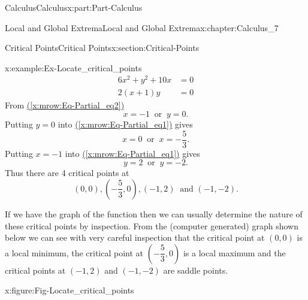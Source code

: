 \documentclass[oneside,10pt,]{book}
\newcommand{\xreffont}{\relax}
\numberwithin{equation}{section}
\newcommand{\amp}{&}
\begin{document}
\begin{partptx}{Calculus}{}{Calculus}{}{}{x:part:Part-Calculus}
\begin{chapterptx}{Local and Global Extrema}{}{Local and Global Extrema}{}{}{x:chapter:Calculus_7}
\begin{sectionptx}{Critical Points}{}{Critical Points}{}{}{x:section:Critical-Points}
\begin{example}{}{x:example:Ex-Locate_critical_points}
\begin{align}
6x^2 + y^2 + 10x \amp = 0\label{x:mrow:Eq-Partial_eq1}\\
2(x+1)y \amp = 0\label{x:mrow:Eq-Partial_eq2}
\end{align}
From \hyperref[x:mrow:Eq-Partial_eq2]{({\xreffont\ref{x:mrow:Eq-Partial_eq2}})}%
\begin{equation*}
x=-1 \: \text{ or } \: y=0\text{.}
\end{equation*}
Putting \(y=0\) into \hyperref[x:mrow:Eq-Partial_eq1]{({\xreffont\ref{x:mrow:Eq-Partial_eq1}})} gives%
\begin{equation*}
x=0 \: \text{ or } \: x=-\dfrac{5}{3}\text{.}
\end{equation*}
Putting \(x=-1\) into \hyperref[x:mrow:Eq-Partial_eq1]{({\xreffont\ref{x:mrow:Eq-Partial_eq1}})} gives%
\begin{equation*}
y=2 \: \text{ or } \: y=-2\text{.}
\end{equation*}
Thus there are 4 critical points at%
\begin{equation*}
\left( 0, 0 \right), \left( -\dfrac{5}{3}, 0 \right), \left( -1, 2 \right) \: \text{ and } \left( -1, -2 \right)\text{.}
\end{equation*}
%
\par
If we have the graph of the function then we can usually determine the nature of these critical points by inspection. From the (computer generated) graph shown below we can see with very careful inspection that the critical point at \((0,0)\) is a local minimum, the critical point at \(\left( -\dfrac{5}{3}, 0 \right)\) is a local maximum and the critical points at \((-1,2)\) and \((-1,-2)\) are saddle points.%
\begin{figureptx}{}{x:figure:Fig-Locate_critical_points}{}%
\begin{image}{0.1}{0.8}{0.1}%

\end{image}
\end{figureptx}
\end{example}
\end{sectionptx}
\end{chapterptx}
\end{partptx}
\end{document}
